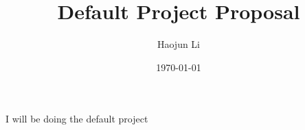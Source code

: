 \documentclass[11pt]{article}
\title{Default Project Proposal}
\author{Haojun Li}
\date{\today}
\begin{document}
	\maketitle
	I will be doing the default project
\end{document}
